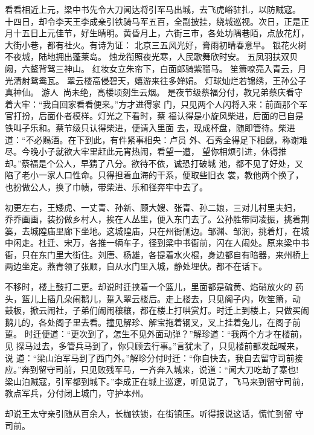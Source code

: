 看看相近上元，梁中书先令大刀闻达将引军马出城，去飞虎峪驻扎，以防贼寇。
十四日，却令李天王李成亲引铁骑马军五百，全副披挂，绕城巡视。次日，正是正
月十五日上元佳节，好生晴明。黄昏月上，六街三市，各处坊隅巷陌，点放花灯，
大街小巷，都有社火。有诗为证：
北京三五风光好，膏雨初晴春意早。
银花火树不夜城，陆地拥出蓬莱岛。
烛龙衔照夜光寒，人民歌舞欣时安。
五凤羽扶双贝阙，六鳌背驾三神山。
红妆女立朱帘下，白面郎骑紫骝马。
笙箫嘹亮入青云，月光清射鸳鸯瓦。
翠云楼高侵碧天，嬉游来往多婵娟。
灯球灿烂若锦绣，王孙公子真神仙。
游人尚未绝，高楼顷刻生云烟。
是夜节级蔡福分付，教兄弟蔡庆看守着大牢：“我自回家看看便来。”方才进得家
门，只见两个人闪将入来：前面那个军官打扮，后面仆者模样。灯光之下看时，蔡
福认得是小旋风柴进，后面的已自是铁叫子乐和。蔡节级只认得柴进，便请入里面
去，现成杯盘，随即管待。柴进道：“不必赐酒。在下到此，有件紧事相央：卢员
外、石秀全得足下相觑，称谢难尽。今晚小子就欲大牢里赶此元宵热闹，看望一遭，
望你相烦引进，休得推却。”蔡福是个公人，早猜了八分。欲待不依，诚恐打破城
池，都不见了好处，又陷了老小一家人口性命。只得担着血海的干系，便取些旧衣
裳，教他两个换了，也扮做公人，换了巾帻，带柴进、乐和径奔牢中去了。

初更左右，王矮虎、一丈青、孙新、顾大嫂、张青、孙二娘，三对儿村里夫妇，
乔乔画画，装扮做乡村人，挨在人丛里，便入东门去了。公孙胜带同凌振，挑着荆
篓，去城隍庙里廊下坐地。这城隍庙，只在州衙侧边。邹渊、邹润，挑着灯，在城
中闲走。杜迁、宋万，各推一辆车子，径到梁中书衙前，闪在人闹处。原来梁中书
衙，只在东门里大街住。刘唐、杨雄，各提着水火棍，身边都自有暗器，来州桥上
两边坐定。燕青领了张顺，自从水门里入城，静处埋伏。都不在话下。

不移时，楼上鼓打二更。却说时迁挟着一个篮儿，里面都是硫黄、焰硝放火的
药头，篮儿上插几朵闹鹅儿，踅入翠云楼后。走上楼去，只见阁子内，吹笙箫，动
鼓板，掀云闹社，子弟们闹闹穰穰，都在楼上打哄赏灯。时迁上到楼上，只做买闹
鹅儿的，各处阁子里去看。撞见解珍、解宝拖着钢叉，叉上挂着兔儿，在阁子前踅。
时迁便道：“更次到了，怎生不见外面动弹？”解珍道：“我两个方才在楼前，见
探马过去，多管兵马到了，你只顾去行事。”言犹未了，只见楼前都发起喊来，说
道：“梁山泊军马到了西门外。”解珍分付时迁：“你自快去，我自去留守司前接
应。”奔到留守司前，只见败残军马，一齐奔入城来，说道：“闻大刀吃劫了寨也!
梁山泊贼寇，引军都到城下。”李成正在城上巡逻，听见说了，飞马来到留守司前，
教点军兵，分付闭上城门，守护本州。

却说王太守亲引随从百余人，长枷铁锁，在街镇压。听得报说这话，慌忙到留
守司前。

